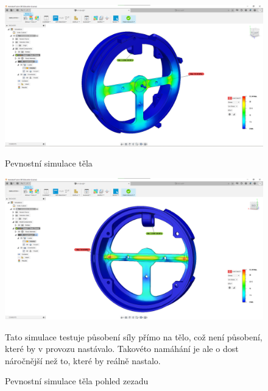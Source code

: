 \begin{figure}
    \centering
    \includegraphics[width=370pt]{kapitoly/obrazky/E4/machanika_tlakove_desky/simulace/F100N,primo,uprostred,pohled_zepredu.png}
    \caption{Pevnostní simulace těla}
    \includegraphics[width=370pt]{kapitoly/obrazky/E4/machanika_tlakove_desky/simulace/F100N,primo,uprostred,pohled_zezadu.png}
    \caption{Pevnostní simulace těla pohled zezadu}
    Tato simulace testuje působení síly přímo na tělo, což není působení, které by v provozu nastávalo. Takovéto namáhání je ale o dost náročnější
    než to, které by reálně nastalo.
    \label{fig:E4-simulace_tela} %
\end{figure}

